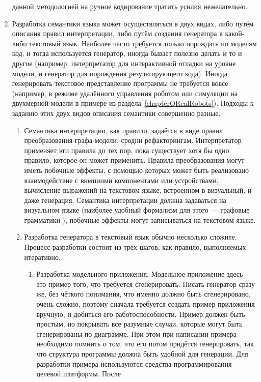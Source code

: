 \begin{enumerate}
		данной методологией на ручное кодирование тратить усилия нежелательно.
	\item Разработка семантики языка может осуществляться в двух видах, либо путём описания 
		правил интерпретации, либо путём создания генератора в какой-либо текстовый язык. 
		Наиболее часто требуется только порождать по моделям код, и тогда используется 
		генератор, иногда бывает полезно делать и то и другое (например, интерпретатор 
		для интерактивной отладки на уровне модели, и генератор для порождения результирующего 
		кода). Иногда генерировать текстовое представление программы не требуется вовсе 
		(например, в режиме удалённого управления роботом или симуляции на двухмерной 
		модели в примере из раздела~\ref{chapterQRealRobots}). Подходы к заданию этих 
		двух видов описания семантики совершенно разные.
		\begin{enumerate}
			\item Семантика интерпретации, как правило, задаётся в виде правил преобразования 
				графа модели, сродни рефакторингам. Интерпретатор применяет эти правила до 
				тех пор, пока существует хотя бы одно правило, которое он может применить. 
				Правила преобразования могут иметь побочные эффекты, с помощью которых может 
				быть реализовано взаимодействие с внешними компонентами или устройствами, 
				вычисление выражений на текстовом языке, встроенном в визуальный, и даже генерация. 
				Семантика интерпретации должна задаваться на визуальном языке (наиболее удобный 
				формализм для этого --- графовые грамматики
				), побочные эффекты могут записываться на текстовом языке.
			\item Разработка генератора в текстовый язык обычно несколько сложнее. Процесс 
				разработки состоит из трёх шагов, как правило, выполняемых итеративно.
				\begin{enumerate}
					\item Разработка модельного приложения. Модельное приложение здесь --- это 
						пример того, что требуется сгенерировать. Писать генератор сразу же, без 
						чёткого понимания, что именно должно быть сгенерировано, очень сложно, 
						поэтому сначала требуется создать пример приложения вручную, и добиться 
						его работоспособности. Пример должен быть простым, но покрывать все разумные 
						случаи, которые могут быть сгенерированы по диаграмме. При этом при написании 
						примера необходимо помнить о том, что его потом придётся генерировать, 
						так что структура программы должна быть удобной для генерации. Для разработки 
						примера используются средства программирования целевой платформы. После 

\end{enumerate}
\end{enumerate}
\end{enumerate}
